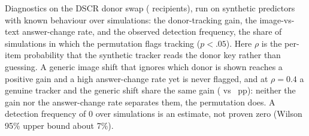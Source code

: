 \documentclass[conference]{IEEEtran}
\begin{document}
\begin{table}[t]
\centering
\footnotesize
\setlength{\tabcolsep}{4pt}
\resizebox{\columnwidth}{!}{%
%
}
\caption{Diagnostics on the DSCR donor swap (\vfourDonorValN{} recipients), run on synthetic predictors with known behaviour over \vfourDonorValSims{} simulations: the donor-tracking gain, the image-vs-text answer-change rate, and the observed detection frequency, the share of simulations in which the permutation flags tracking ($p<.05$). Here $\rho$ is the per-item probability that the synthetic tracker reads the donor key rather than guessing. A generic image shift that ignores which donor is shown reaches a positive gain and a high answer-change rate yet is never flagged, and at $\rho=0.4$ a genuine tracker and the generic shift share the same gain (\vfourDonorValTrackLowGain{} vs \vfourDonorValShiftGain{}~pp): neither the gain nor the answer-change rate separates them, the permutation does. A detection frequency of 0 over \vfourDonorValSims{} simulations is an estimate, not proven zero (Wilson 95\% upper bound about 7\%).}
\label{tab:donorval}
\end{table}



\end{document}

